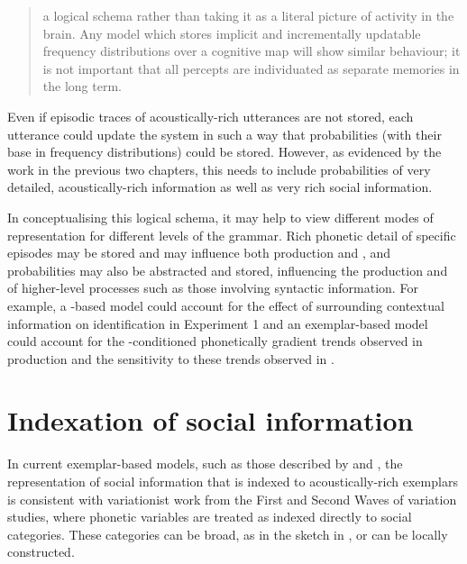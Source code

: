 \begin{quote}

a logical schema rather than taking it as a literal picture of activity in the brain.  Any model which stores implicit and incrementally updatable frequency distributions over a cognitive map will show similar behaviour; it is not important that all percepts are individuated as separate memories in the long term. \citep[113]{pierrehumbert2002}

\end{quote}

\noindent Even if episodic traces of acoustically-rich utterances are not stored, each utte\-rance could update the system in such a way that probabilities (with their base in frequency distributions) could be stored.  However, as evidenced by the work in the previous two chapters, this needs to include probabilities of very detailed, acoustically-rich information as well as very rich social information.

	
In conceptualising this logical schema, it may help to view different modes of representation for different levels of the grammar.  Rich phonetic detail of specific episodes may be stored and may influence both production and , and probabilities may also be abstracted and stored, influencing the production and  of higher-level processes such as those involving syntactic information.  For example, a -based model could account for the effect of surrounding contextual information on  identification in Experiment 1 and an exemplar-based model could account for the -conditioned phone\-tically gradient trends observed in production and the sensitivity to these trends observed in . 


\section{Indexation of social information}\label{sec:richmodel}

In current exemplar-based models, such as those described by \citet{johnson1997} and \citet{haywarrendrager2010}, the representation of social information that is indexed to acoustically-rich exemplars is consistent with variationist work from the First and Second Waves of variation studies, where phonetic variables are treated as indexed directly to social categories. These categories can be broad, as in the sketch in , or can be locally constructed.  

